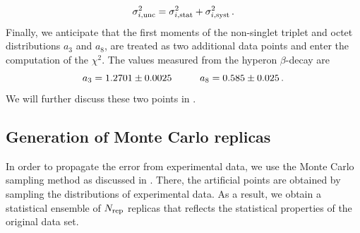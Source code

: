 \begin{equation}
  \sigma_{i,\textrm{unc}}^2 = \sigma_{i,\textrm{stat}}^2 + \sigma_{i,\textrm{syst}}^2 \,.
\end{equation}
Finally, we anticipate that the first moments of the non-singlet triplet and octet distributions $a_3$ and $a_8$, are treated as two additional data points and enter the computation of the $\chi^2$. The values measured from the hyperon $\beta$-decay are \cite{Nakamura_2010}
\begin{equation}
  a_3 = 1.2701 \pm 0.0025 \hspace{10mm} a_8 = 0.585 \pm 0.025 \,.
  \label{eq:a3_a8_values}
\end{equation}
We will further discuss these two points in .

\subsection*{Generation of Monte Carlo replicas}
In order to propagate the error from experimental data, we use the Monte Carlo sampling method as discussed in . There, the artificial points are obtained by sampling the distributions of experimental data. As a result, we obtain a statistical ensemble of $N_{\textrm{rep}}$ replicas that reflects the statistical properties of the original data set.%

